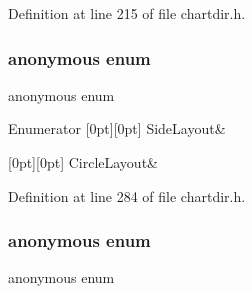 Definition at line 215 of file chartdir.\+h.

\mbox{\label{namespace_chart_aa357b1b5e740352f0c772478161f6560}} 
\subsubsection{\texorpdfstring{anonymous enum}{anonymous enum}}
{\footnotesize\ttfamily anonymous enum}

\begin{DoxyEnumFields}{Enumerator}
[0pt][0pt]{}\mbox{\label{namespace_chart_aa357b1b5e740352f0c772478161f6560a0ef03e0951e37d87acd948c5b77d447c}} 
Side\+Layout&\\
\hline

[0pt][0pt]{}\mbox{\label{namespace_chart_aa357b1b5e740352f0c772478161f6560ad24858c4980696fed7d4e76e6cbdb34f}} 
Circle\+Layout&\\
\hline

\end{DoxyEnumFields}


Definition at line 284 of file chartdir.\+h.

\mbox{\label{namespace_chart_a26583756db814387c0f5f6029ef5c43e}} 
\subsubsection{\texorpdfstring{anonymous enum}{anonymous enum}}
{\footnotesize\ttfamily anonymous enum}

